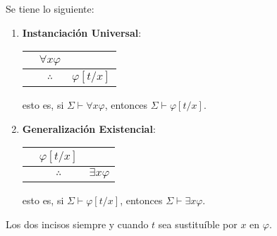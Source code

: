 \documentclass[12pt]{report}
\newcounter{it}
\theoremstyle{largebreak}
\begin{document}
    \begin{theor}
        Se tiene lo siguiente:
        \begin{enumerate}
            \item \textbf{Instanciación Universal}:
            \begin{center}
                \begin{tabular}{c c c}
                    & $\forall x\varphi$  &  \\
                    \hline
                     & $\therefore$ & $\varphi[t/x]$ \\
                \end{tabular}
            \end{center}
            esto es, si $\Sigma\vdash\forall x\varphi$, entonces $\Sigma\vdash\varphi[t/x]$.
            \item \textbf{Generalización Existencial}:
            \begin{center}
                \begin{tabular}{c c c}
                    & $\varphi[t/x]$  &  \\
                    \hline
                     & $\therefore$ & $\exists x\varphi$ \\
                \end{tabular}
            \end{center}
            esto es, si $\Sigma\vdash\varphi[t/x]$, entonces $\Sigma\vdash\exists x\varphi$.
        \end{enumerate}
        Los dos incisos siempre y cuando $t$ sea sustituíble por $x$ en $\varphi$. 
    \end{theor}
\end{document}
